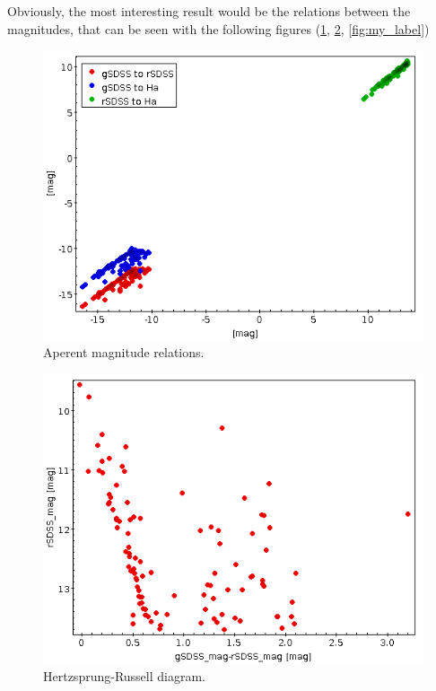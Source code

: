 \documentclass{aa}
\begin{document}
    Obviously, the most interesting result would be the relations between the magnitudes, that can be seen with the following figures (\ref{fig: Color to Color}, \ref{fig: HR diagram}, \ref{fig:my_label})
    \begin{figure}[H]
        \centering
        \includegraphics[width=0.8\linewidth]{Images/ColorToColor.png}
        \caption{Aperent magnitude relations.}
        \label{fig: Color to Color}
    \end{figure}
    \begin{figure}[H]
        \centering
        \includegraphics[width=0.8\linewidth]{Images/HRdiagram_rg.png}
        \caption{Hertzsprung-Russell diagram.}
        \label{fig: HR diagram}
    \end{figure}
\end{document}
